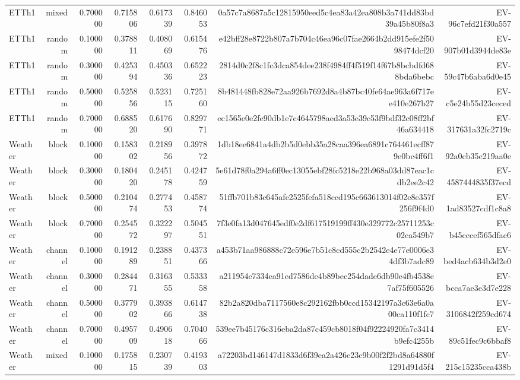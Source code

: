 \begin{tabular}{lrrrrrrr}
ETTh1 & mixed & 0.700000 & 0.715806 & 0.617339 & 0.846053 & 0a57c7a8687a5c12815950eed5c4ea83a42ea808b3a741dd83bd39a45b80f8a3 & EV-96c7efd21f30a557 \\
ETTh1 & random & 0.100000 & 0.378811 & 0.408069 & 0.615476 & e42bff28e8722b807a7b704c46ea96c07fae2664b2dd915efe2f5098474dcf20 & EV-907b01d3944de83e \\
ETTh1 & random & 0.300000 & 0.425394 & 0.450336 & 0.652223 & 2814d0c2f8c1fc3dca854dee238f4984ff4f519f14f67b8bcbdfd688bda6bebc & EV-59c47b6aba6d0e45 \\
ETTh1 & random & 0.500000 & 0.525856 & 0.523115 & 0.725160 & 8b481448fb828e72aa926b7692d8a4b87bc40fe64ae963a6f717ee410e267b27 & EV-c5e24b55d23ceced \\
ETTh1 & random & 0.700000 & 0.688520 & 0.617690 & 0.829771 & ec1565e0e2fe90db1e7c4645798aed3a53e39c53f9bdf32c08ff2bf46a634418 & EV-317631a32fc2719c \\
Weather & block & 0.100000 & 0.158302 & 0.218956 & 0.397872 & 1db18ee6841a4db2b5d0ebb35a28caa396ea6891c764461ecff879e0bc4ff6f1 & EV-92a0cb35c219aa0e \\
Weather & block & 0.300000 & 0.180420 & 0.245178 & 0.424759 & 5e61d78f0a294a6ff0ec13055ebf28fc5218e22b968a03dd87eac1cdb2ee2c42 & EV-4587444835f37ecd \\
Weather & block & 0.500000 & 0.210474 & 0.277453 & 0.458774 & 51ffb701b83c645afe2525fefa518ccd195c663613014f02e8e357f256f9f4d0 & EV-1ad83527cdf1c8a8 \\
Weather & block & 0.700000 & 0.254572 & 0.322297 & 0.504551 & 7f3e0fa13d047645edf0e2df617519199ff430e329772c25711253c02ca549b7 & EV-b45cccef565dfac6 \\
Weather & channel & 0.100000 & 0.191289 & 0.238851 & 0.437366 & a453b71aa986888c72e596e7b51c8cd555c2b2542e4e77e0006e34df3b7adc89 & EV-bed4acb634b3d2e0 \\
Weather & channel & 0.300000 & 0.284471 & 0.316355 & 0.533358 & a211954e7334ea91cd7586de4b89bec254dade6db90e4fb4538e7af75f605526 & EV-bcca7ae3e3d7e228 \\
Weather & channel & 0.500000 & 0.377902 & 0.393866 & 0.614738 & 82b2a820dba7117560e8c292162fbb0ccd15342197a3c63e6a0a00ca110f1fc7 & EV-3106842f259cd674 \\
Weather & channel & 0.700000 & 0.495709 & 0.490618 & 0.704066 & 539ee7b45176c316eba2da87c459cb8018f04f92224920fa7c3414b9efc4255b & EV-89c51fec9c6bbaf8 \\
Weather & mixed & 0.100000 & 0.175815 & 0.230739 & 0.419303 & a72203bd146147d1833d6f39ea2a426c23c9b00f2f2bd8a64880f1291d91d5f4 & EV-215c15235cca438b \\

\end{tabular}
